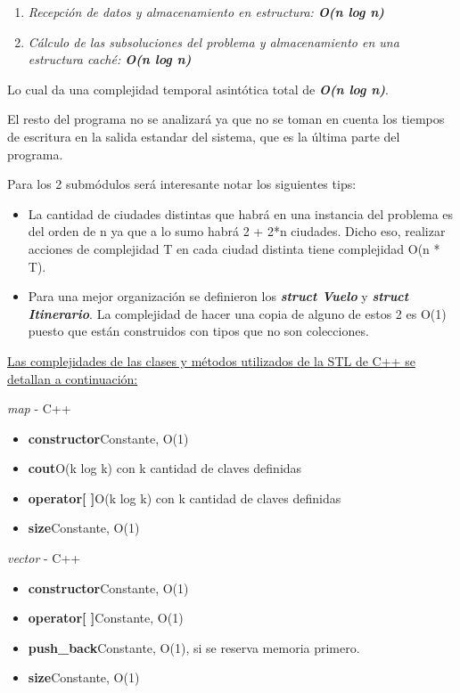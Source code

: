 \documentclass[10pt,a4paper]{article}
\begin{document}
\begin{enumerate}
\item \textit{Recepción de datos y almacenamiento en estructura: \textbf{O(n log n)}}
\item \textit{Cálculo de las subsoluciones del problema y almacenamiento en una estructura caché: \textbf{O(n log n)}}
\end{enumerate}

\noindent Lo cual da una complejidad temporal asintótica total de \textit{\textbf{O(n log n)}}.

\noindent El resto del programa no se analizará ya que no se toman en cuenta los tiempos de escritura en la salida estandar del sistema, que es la última parte del programa.

\noindent Para los 2 submódulos será interesante notar los siguientes tips:
\begin{itemize}
\item La cantidad de ciudades distintas que habrá en una instancia del problema es del orden de n ya que a lo sumo habrá 2 + 2*n ciudades. Dicho eso, realizar acciones de complejidad T en cada ciudad distinta tiene complejidad O(n * T).
\item Para una mejor organización se definieron los \textit{\textbf{struct Vuelo}} y \textit{\textbf{struct Itinerario}}. La complejidad de hacer una copia de alguno de estos 2 es O(1) puesto que están construidos con tipos que no son colecciones.\\
\end{itemize}

\underline{Las complejidades de las clases y métodos utilizados de la STL de C++ se detallan a continuación:}

\indent \textit{map} - C++
\begin{itemize}
\item \textbf{constructor}\hspace{10 px}Constante, O(1)
\item \textbf{cout}\hspace{46 px}O(k log k) con k cantidad de claves definidas
\item \textbf{operator[ ]}\hspace{15 px}O(k log k) con k cantidad de claves definidas
\item \textbf{size}\hspace{50 px}Constante, O(1)
\end{itemize}

\indent \textit{vector} - C++
\begin{itemize}
\item \textbf{constructor}\hspace{11 px}Constante, O(1)
\item \textbf{operator[ ]}\hspace{15 px}Constante, O(1)
\item \textbf{push\_back}\hspace{17 px}Constante, O(1), si se reserva memoria primero.
\item \textbf{size}\hspace{50 px}Constante, O(1)
\end{itemize}
\end{document}

